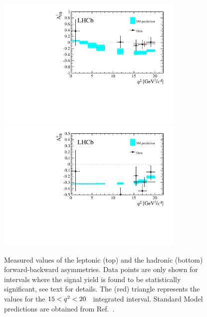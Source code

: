 \begin{figure}[ptb]
\centering
\includegraphics[width=0.8\textwidth]{Lmumu/figs/paper/figure8a.pdf}
\includegraphics[width=0.8\textwidth]{Lmumu/figs/paper/figure8b.pdf}
\caption{Measured values of the leptonic (top) and the hadronic (bottom)
  forward-backward asymmetries. Data points are only shown for \qsq intervals 
  where the signal yield is found to be statistically significant, see text for details.
  The (red) triangle represents the values for the $15 < q^2 < 20$~\gevgevcccc
  integrated interval. Standard Model predictions are obtained from Ref.~\cite{Meinel:2014wua}.}
\label{fig:Afb_results}
\end{figure}


